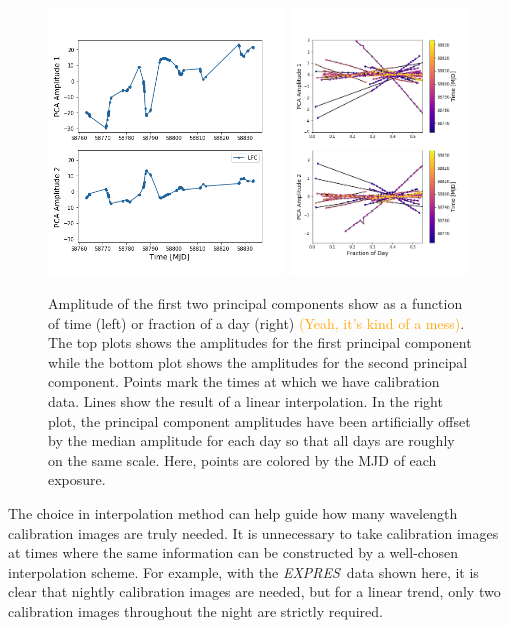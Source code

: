 \documentclass[modern]{aastex63}
\newcommand{\project}[1]{\textsl{#1}}
\newcommand{\acronym}[1]{{\small{#1}}}
\newcommand{\expres}{\project{\acronym{EXPRES}}}
\newcommand{\lz}[1]{\textcolor{orange}{#1}}
\begin{document}
\begin{figure}[h!]
\centering
\includegraphics[width=0.56\textwidth]{Figures/pcA_lfc.png}
\includegraphics[width=0.42\textwidth]{Figures/pcAs_byDay.png}
\caption{Amplitude of the first two principal components show as a function of time (left) or fraction of a day (right) \lz{(Yeah, it's kind of a mess)}.  The top plots shows the amplitudes for the first principal component while the bottom plot shows the amplitudes for the second principal component.  Points mark the times at which we have calibration data.  Lines show the result of a linear interpolation.  In the right plot, the principal component amplitudes have been artificially offset by the median amplitude for each day so that all days are roughly on the same scale.  Here, points are colored by the MJD of each exposure.}
\label{fig:nightlyVariation}
\end{figure} 

The choice in interpolation method can help guide how many wavelength calibration images are truly needed.  It is unnecessary to take calibration images at times where the same information can be constructed by a well-chosen interpolation scheme.  For example, with the \expres\ data shown here, it is clear that nightly calibration images are needed, but for a linear trend, only two calibration images throughout the night are strictly required.
\end{document}
